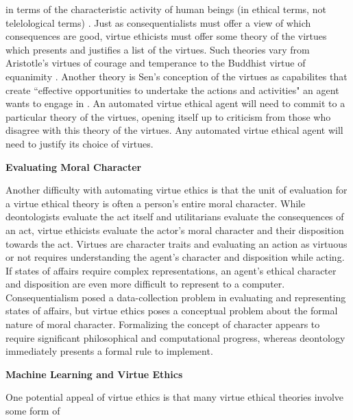 \begin{isabellebody}
\begin{isamarkuptext}
in terms of the characteristic activity of human beings (in ethical terms, not telelological terms) \citep{snow}. 
Just as consequentialists must offer a view of which consequences are good, virtue ethicists must offer some 
theory of the virtues which presents and justifies a list of the virtues. Such theories vary
from Aristotle's virtues of courage and temperance to the Buddhist virtue of 
equanimity \citep{aristotle, mcrae}. Another theory is Sen's conception of the virtues as capabilites that create
``effective opportunities to undertake the actions and activities" an agent wants to engage in \citep{robeyns}. 
An automated virtue ethical agent will need to commit to a particular theory of the virtues, opening 
itself up to criticism from those who disagree with this theory of the virtues. Any automated virtue
ethical agent will need to justify its choice of virtues.%
\end{isamarkuptext}\isamarkuptrue%
%
\begin{isamarkuptext}%
\textbf{Evaluating Moral Character}%
\end{isamarkuptext}\isamarkuptrue%
%
\begin{isamarkuptext}%
Another difficulty with automating virtue ethics is that the unit of evaluation for a virtue ethical
theory is often a person's entire moral character. While deontologists evaluate the act itself and utilitarians
evaluate the consequences of an act, virtue ethicists evaluate the actor's moral character and their 
disposition towards the act. Virtues are character traits and evaluating an action as virtuous or 
not requires understanding the agent's character and disposition while acting. If states of affairs
require complex representations, an agent's ethical character and disposition are even more difficult
to represent to a computer. Consequentialism posed a data-collection problem in evaluating and representing states
of affairs, but virtue ethics poses a conceptual problem about the formal nature of moral character.
Formalizing the concept of character appears to require significant philosophical and computational
progress, whereas deontology immediately presents a formal rule to implement.%
\end{isamarkuptext}\isamarkuptrue%
%
\begin{isamarkuptext}%
\textbf{Machine Learning and Virtue Ethics}%
\end{isamarkuptext}\isamarkuptrue%
%
\begin{isamarkuptext}%
One potential appeal of virtue ethics is that many virtue ethical theories involve some form of 

\end{isamarkuptext}
\end{isabellebody}
